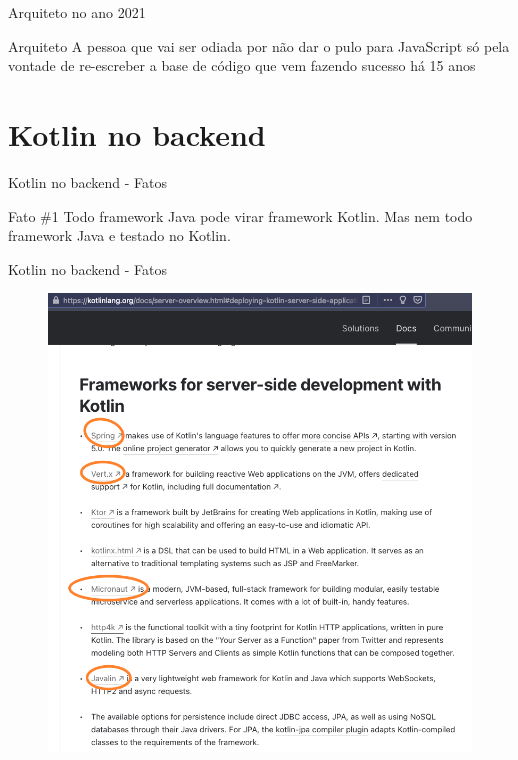 \documentclass[aspectratio=169]{beamer}
\begin{document}
\begin{frame}{Arquiteto no ano 2021}

\begin{exampleblock}{Arquiteto}
A pessoa que vai ser odiada por não dar o pulo para JavaScript só pela vontade de re-escreber a base de código que vem fazendo sucesso há 15 anos
\end{exampleblock}
\end{frame}

{
    \section{Kotlin no backend}
}


\begin{frame}{Kotlin no backend - Fatos}

\begin{exampleblock}{Fato \#1}
Todo framework Java pode virar framework Kotlin. Mas nem todo framework Java e testado no Kotlin.
\end{exampleblock}
\end{frame}

\begin{frame}{Kotlin no backend - Fatos}
\begin{figure}
	\centering
	\includegraphics[width=0.55\linewidth]{Images/fwkotlin}
\end{figure}
\end{frame}
\end{document}
